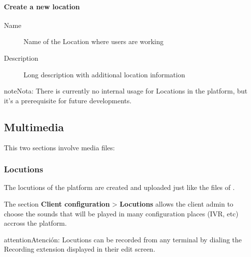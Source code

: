 \documentclass[letterpaper,10pt,spanish]{sphinxmanual}
\begin{document}
\paragraph{Create a new location}
\begin{description}
\item[{Name}] \leavevmode{}\label{administration_portal/client/vpbx/user_configuration/locations:term-name}
Name of the Location where users are working

\item[{Description}] \leavevmode{}\label{administration_portal/client/vpbx/user_configuration/locations:term-description}
Long description with additional location information

\end{description}

\begin{notice}{note}{Nota:}
There is currently no internal usage for Locations in the
platform, but it's a prerequisite for future developments.
\end{notice}


\subsection{Multimedia}
\label{administration_portal/client/vpbx/multimedia/index:multimedia}\label{administration_portal/client/vpbx/multimedia/index::doc}
This two sections involve media files:


\subsubsection{Locutions}
\label{administration_portal/client/vpbx/multimedia/locutions:locutions}\label{administration_portal/client/vpbx/multimedia/locutions::doc}
The locutions of the platform are created and uploaded just like the files of
{\hyperref[administration_portal/client/vpbx/multimedia/music_on_hold:musiconhold]{}}.

The section \textbf{Client configuration} \textgreater{} \textbf{Locutions}  allows the client admin
to choose the sounds that will be played in many configuration places (IVR, etc)
accross the platform.

\begin{notice}{attention}{Atención:}
Locutions can be recorded from any terminal by dialing the
Recording extension displayed in their edit screen.
\end{notice}
\end{document}
